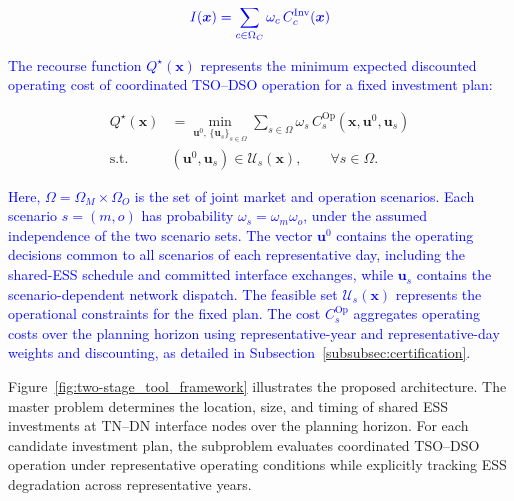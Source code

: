 \documentclass[preprint,12pt]{elsarticle}
\begin{document}
\begin{equation}
    \textcolor{blue}{
        I(\boldsymbol{x}) = \sum_{c\in\Omega_C} \omega_c\, C_c^{\text{Inv}}(\boldsymbol{x})
    }
    \label{eq:investment_cost_generic}
\end{equation}

\noindent
\textcolor{blue}{The recourse function $Q^\star(\boldsymbol{x})$ represents the minimum expected discounted operating cost of coordinated TSO--DSO operation for a fixed investment plan:}

\begin{subequations}
    \begin{align}
        Q^\star(\boldsymbol{x})
        &=
        \min_{\boldsymbol{u}^{0},\,\{\boldsymbol{u}_s\}_{s\in\Omega}}
        \sum_{s\in\Omega}
        \omega_s\,C_s^{\mathrm{Op}}
        \left(\boldsymbol{x},\boldsymbol{u}^{0},\boldsymbol{u}_s\right)
        \\
        \text{s.t.}\quad
        &(\boldsymbol{u}^{0},\boldsymbol{u}_s)
        \in\mathcal{U}_s(\boldsymbol{x}),
        \qquad \forall s\in\Omega .
    \end{align}
    \label{eq:operational_recourse_function}
\end{subequations}

\noindent
\textcolor{blue}{
   Here, 
   $\Omega=\Omega_M\times\Omega_O$ is the set of joint market and operation scenarios. Each scenario $s=(m,o)$ has probability $\omega_s=\omega_m\omega_o$, under the assumed independence of the two scenario sets. 
   The vector $\boldsymbol{u}^{0}$ contains the operating decisions common to all scenarios of each representative day, including the shared-ESS schedule and committed interface exchanges, while $\boldsymbol{u}_s$ contains the scenario-dependent network dispatch. 
   The feasible set $\mathcal{U}_s(\boldsymbol{x})$ represents the operational constraints for the fixed plan. The cost $C_s^{\mathrm{Op}}$ aggregates operating costs over the planning horizon using representative-year and representative-day weights and discounting, as detailed in Subsection~\ref{subsubsec:certification}.
}

Figure~\ref{fig:two-stage_tool_framework} illustrates the proposed architecture. The master problem determines the location, size, and timing of shared ESS investments at TN--DN interface nodes over the planning horizon. For each candidate investment plan, the subproblem evaluates coordinated TSO--DSO operation under representative operating conditions while explicitly tracking ESS degradation across representative years.
\end{document}
